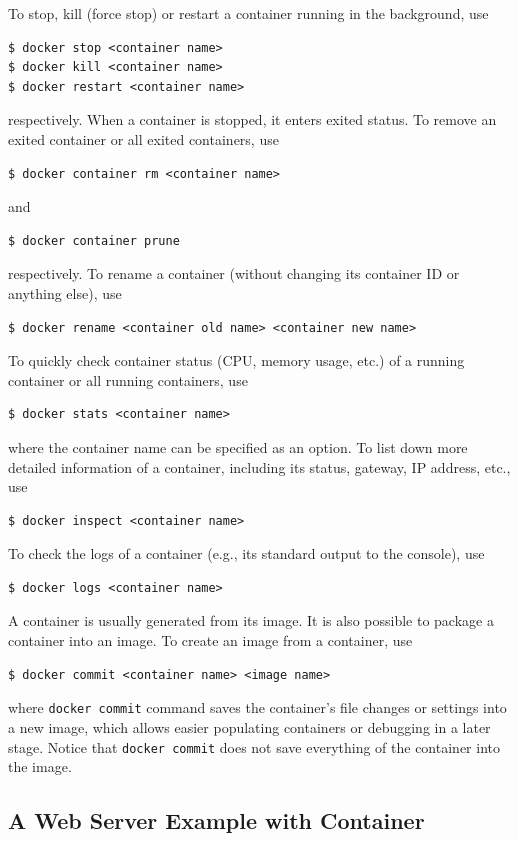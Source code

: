 To stop, kill (force stop) or restart a container running in the background, use
\begin{lstlisting}
$ docker stop <container name>
$ docker kill <container name>
$ docker restart <container name>
\end{lstlisting}
respectively. When a container is stopped, it enters exited status. To remove an exited container or all exited containers, use
\begin{lstlisting}
$ docker container rm <container name>
\end{lstlisting}
and
\begin{lstlisting}
$ docker container prune
\end{lstlisting}
respectively. To rename a container (without changing its container ID or anything else), use
\begin{lstlisting}
$ docker rename <container old name> <container new name>
\end{lstlisting}
To quickly check container status (CPU, memory usage, etc.) of a running container or all running containers, use
\begin{lstlisting}
$ docker stats <container name>
\end{lstlisting}
where the container name can be specified as an option. To list down more detailed information of a container, including its status, gateway, IP address, etc., use
\begin{lstlisting}
$ docker inspect <container name>
\end{lstlisting}
To check the logs of a container (e.g., its standard output to the console), use
\begin{lstlisting}
$ docker logs <container name>
\end{lstlisting}

A container is usually generated from its image. It is also possible to package a container into an image. To create an image from a container, use
\begin{lstlisting}
$ docker commit <container name> <image name>
\end{lstlisting}
where \verb|docker commit| command saves the container's file changes or settings into a new image, which allows easier populating containers or debugging in a later stage. Notice that \verb|docker commit| does not save everything of the container into the image.

\subsection{A Web Server Example with Container}

